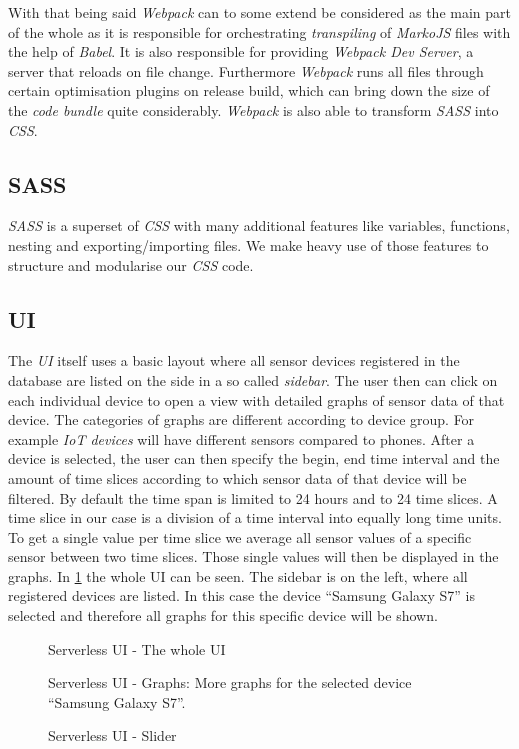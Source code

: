With that being said \textit{Webpack} can to some extend be considered as the main part of the whole
 as it is responsible for orchestrating \textit{transpiling} of
\textit{MarkoJS} files with the help of \textit{Babel}. It is also responsible for providing
\textit{Webpack Dev Server}, a server that reloads on file change. Furthermore \textit{Webpack} runs
all files through certain optimisation plugins on release build, which can bring down the size of
the \textit{code bundle} quite considerably. \textit{Webpack} is also able to transform
\textit{SASS} into \textit{CSS}.

\subsection{SASS}

\textit{SASS} \cite{sass} is a superset of \textit{CSS} with many additional features like
variables, functions, nesting and exporting/importing files. We make heavy use of those features to
structure and modularise our \textit{CSS} code.

\subsection{UI}
\label{sec:ui}

The \textit{UI} itself uses a basic layout where all sensor devices registered in the database are
listed on the side in a so called \textit{sidebar}. The user then can click on each individual
device to open a view with detailed graphs of sensor data of that device. The categories of graphs
are different according to device group. For example \textit{IoT devices} will have different
sensors compared to phones. After a device is selected, the user can then specify the begin, end
time interval and the amount of time slices according to which sensor data of that device will be
filtered. By default the time span is limited to 24 hours and to 24 time slices. A time slice in our
case is a division of a time interval into equally long time units. To get a single value per time
slice we average all sensor values of a specific sensor between two time slices. Those single values
will then be displayed in the graphs. In \ref{fig:ui} the whole UI can be seen. The sidebar is on
the left, where all registered devices are listed. In this case the device “Samsung Galaxy S7” is
selected and therefore all graphs for this specific device will be shown.

\begin{figure}[H]
  \centering
  \caption{Serverless UI - The whole UI}
  \label{fig:ui}
\end{figure}

\begin{figure}[H]
  \centering
  \caption{Serverless UI - Graphs: More graphs for the selected device “Samsung Galaxy S7”.}
\end{figure}

\begin{figure}[H]
  \centering
  \caption{Serverless UI - Slider}
\end{figure}
